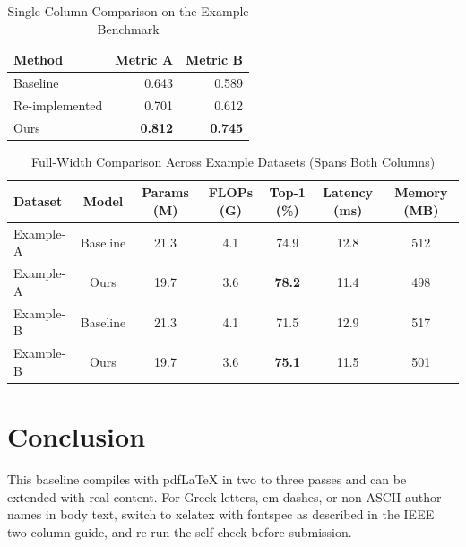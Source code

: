 \documentclass[journal,10pt]{IEEEtran}
\begin{document}
\begin{table}[!t]
  \renewcommand{\arraystretch}{1.1}
  \setlength{\tabcolsep}{2pt}
  \caption{Single-Column Comparison on the Example Benchmark}
  \label{tab:single}
  \centering
  \scriptsize
  \begin{tabular}{@{}lrr@{}}
    \toprule
    Method & Metric A & Metric B \\
    \midrule
    Baseline       & 0.643 & 0.589 \\
    Re-implemented & 0.701 & 0.612 \\
    Ours           & \textbf{0.812} & \textbf{0.745} \\
    \bottomrule
  \end{tabular}
\end{table}

\begin{table}[!t]
  \renewcommand{\arraystretch}{1.15}
  \setlength{\tabcolsep}{5pt}
  \caption{Full-Width Comparison Across Example Datasets (Spans Both Columns)}
  \label{tab:full}
  \centering
  \footnotesize
  \begin{tabular}{@{}lcccccc@{}}
    \toprule
    Dataset & Model & Params (M) & FLOPs (G) & Top-1 (\%) & Latency (ms) & Memory (MB) \\
    \midrule
    Example-A & Baseline & 21.3 & 4.1 & 74.9 & 12.8 & 512 \\
    Example-A & Ours     & 19.7 & 3.6 & \textbf{78.2} & 11.4 & 498 \\
    Example-B & Baseline & 21.3 & 4.1 & 71.5 & 12.9 & 517 \\
    Example-B & Ours     & 19.7 & 3.6 & \textbf{75.1} & 11.5 & 501 \\
    \bottomrule
  \end{tabular}
\end{table}

\section{Conclusion}
This baseline compiles with pdfLaTeX in two to three passes and can be
extended with real content. For Greek letters, em-dashes, or non-ASCII
author names in body text, switch to xelatex with fontspec as described in
the IEEE two-column guide, and re-run the self-check before submission.
\end{document}

